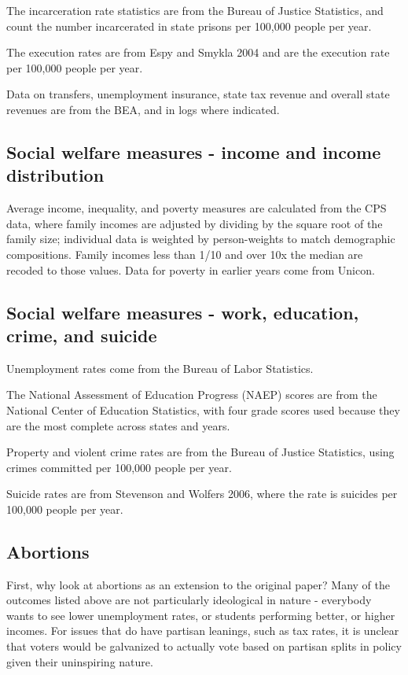 \documentclass{article}
\begin{document}
The incarceration rate statistics are from the Bureau of Justice Statistics, and count the number incarcerated in state prisons per 100,000 people per year.

The execution rates are from Espy and Smykla 2004 and are the execution rate per 100,000 people per year.

Data on transfers, unemployment insurance, state tax revenue and overall state revenues are from the BEA, and in logs where indicated.

\subsection{Social welfare measures - income and income distribution}

Average income, inequality, and poverty measures are calculated from the CPS data, where family incomes are adjusted by dividing by the square root of the family size; individual data is weighted by person-weights to match demographic compositions. Family incomes less than 1/10 and over 10x the median are recoded to those values. Data for poverty in earlier years come from Unicon.

\subsection{Social welfare measures - work, education, crime, and suicide}

Unemployment rates come from the Bureau of Labor Statistics.

The National Assessment of Education Progress (NAEP) scores are from the National Center of Education Statistics, with four grade scores used because they are the most complete across states and years.

Property and violent crime rates are from the Bureau of Justice Statistics, using crimes committed per 100,000 people per year.

Suicide rates are from Stevenson and Wolfers 2006, where the rate is suicides per 100,000 people per year.

\subsection{Abortions}

First, why look at abortions as an extension to the original paper? Many of the outcomes listed above are not particularly ideological in nature - everybody wants to see lower unemployment rates, or students performing better, or higher incomes. For issues that do have partisan leanings, such as tax rates, it is unclear that voters would be galvanized to actually vote based on partisan splits in policy given their uninspiring nature.
\end{document}
